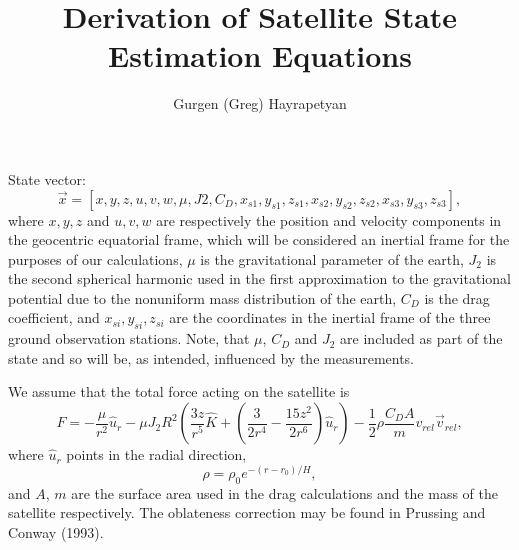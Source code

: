 \documentclass[]{article}
\begin{document}
\title{Derivation of Satellite State Estimation Equations}
\author{Gurgen (Greg) Hayrapetyan}
\maketitle

State vector: 
$$
\vec{x} = [x,y,z,u,v,w,\mu,J2,C_D, x_{s1}, y_{s1}, z_{s1}, x_{s2}, y_{s2}, z_{s2}, x_{s3}, y_{s3}, z_{s3}],
$$
where $x,y,z$ and $u,v,w$ are respectively the position and velocity components in the geocentric equatorial frame, which will be considered an inertial frame for the purposes of our calculations, $\mu$ is the gravitational parameter of the earth, $J_2$ is the second spherical harmonic used in the first approximation to the gravitational potential due to the nonuniform mass distribution of the earth, $C_D$ is the drag coefficient, and $x_{si}, y_{si}, z_{si}$ are the coordinates in the inertial frame of the three ground observation stations.  Note, that $\mu$, $C_D$ and $J_2$ are included as part of the state and so will be, as intended, influenced by the measurements. 

We assume that the total force acting on the satellite is
$$
F = -\frac{\mu}{r^2} \hat{u}_r -\mu J_2 R^2 \left( \frac{3z}{r^5} \hat{K} + \left( \frac{3}{2r^4} - \frac{15z^2}{2r^6} \right) \hat{u}_r \right) - \frac{1}{2} \rho \frac{C_D  A}{m} v_{rel} \vec{v}_{rel}, 
$$
where $\hat{u}_r$ points in the radial direction,
$$
\rho = \rho_0 e^{-(r-r_0)/H},
$$
and $A$, $m$ are the surface area used in the drag calculations and the mass of the satellite respectively.
The oblateness correction may be found in Prussing and Conway (1993).
\end{document}
